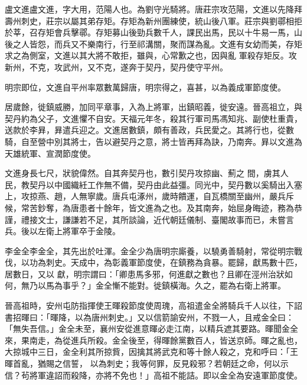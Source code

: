 
\begin{pinyinscope}

 盧文進盧文進，字大用，范陽人也。為劉守光騎將。唐莊宗攻范陽，文進以先降拜壽州刺史，莊宗以屬其弟存矩。存矩為新州團練使，統山後八軍。莊宗與劉鄩相拒於莘，召存矩會兵擊鄩。存矩募山後勁兵數千人，課民出馬，民以十牛易一馬，山後之人皆怨，而兵又不樂南行，行至祁溝關，聚而謀為亂。文進有女幼而美，存矩求之為側室，文進以其大將不敢拒，雖與，心常歉之也，因與亂
 軍殺存矩反。攻新州，不克，攻武州，又不克，遂奔于契丹，契丹使守平州。



 明宗即位，文進自平州率眾數萬歸唐，明宗得之，喜甚，以為義成軍節度使。



 居歲餘，徙鎮威勝，加同平章事，入為上將軍，出鎮昭義，徙安遠。晉高祖立，與契丹約為父子，文進懼不自安。天福元年冬，殺其行軍司馬馮知兆、副使杜重貴，送款於李昪，昪遣兵迎之。文進居數鎮，頗有善政，兵民愛之。其將行也，從數騎，自至營中別其將士，告以避契丹之意，將士皆再拜為訣，乃南奔。昪以文進為天雄統軍、宣潤節度使。



 文進身長七尺，狀貌偉然。自其奔契丹也，數引契丹攻掠幽、薊之
 間，虜其人民，教契丹以中國織紝工作無不備，契丹由此益彊。同光中，契丹數以奚騎出入塞上，攻掠燕、趙，人無寧歲。唐兵屯涿州，歲時饋運，自瓦橋關至幽州，嚴兵斥候，常苦鈔奪，為唐患者十餘年，皆文進為之也。及其南奔，始屈身晦迹，務為恭謹，禮接文士，謙謙若不足，其所談論，近代朝廷儀制、臺閣故事而已，未嘗言兵。後以左衛上將軍卒于金陵。



 李金全李金全，其先出於吐渾。金全少為唐明宗廝養，以驍勇善騎射，常從明宗戰伐，以功為刺史。天成中，為彰義軍節度使，在鎮務為貪暴。罷歸，獻馬數十匹，居數日，又以
 獻，明宗謂曰：「卿患馬多邪，何進獻之數也？且卿在涇州治狀如何，無乃以馬為事乎？」金全慚不能對。徙鎮橫海。久之，罷為右衛上將軍。



 晉高祖時，安州屯防指揮使王暉殺節度使周瑰，高祖遣金全將騎兵千人以往，下詔書招暉曰：「暉降，以為唐州刺史。」又以信箭諭安州，不戮一人，且戒金全曰：「無失吾信。」金全未至，襄州安從進意暉必走江南，以精兵遮其要路。暉聞金全來，果南走，為從進兵所殺。金全後至，得暉餘黨數百人，皆送京師。暉之亂也，大掠城中三日，金全利其所掠貲，因擒其將武克和等十餘人殺之，克和呼曰：「王暉首亂，猶賜之信誓，
 以為刺史；我等何罪，反見殺邪？若朝廷之命，何以示信？茍將軍違詔而殺降，亦將不免也！」高祖不能詰。即以金全為安遠軍節度使。




\end{pinyinscope}
